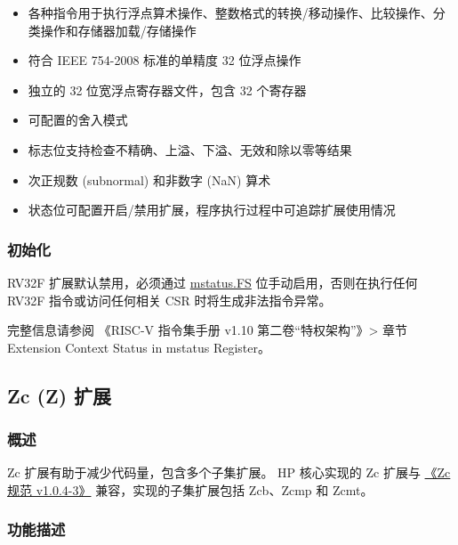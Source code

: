 \documentclass[main\_\_CN.tex]{subfiles}
\begin{document}
\begin{itemize}
    \item 各种指令用于执行浮点算术操作、整数格式的转换/移动操作、比较操作、分类操作和存储器加载/存储操作
    \item 符合 IEEE 754-2008 标准的单精度 32 位浮点操作
    \item 独立的 32 位宽浮点寄存器文件，包含 32 个寄存器
    \item 可配置的舍入模式
    \item 标志位支持检查不精确、上溢、下溢、无效和除以零等结果
    \item 次正规数 (subnormal) 和非数字 (NaN) 算术
    \item 状态位可配置开启/禁用扩展，程序执行过程中可追踪扩展使用情况
\end{itemize}

\subsubsection{初始化}
\label{sec:riscvcpu-fpu-init}

RV32F 扩展默认禁用，必须通过 \hyperref[fielddesc:MSTATUS_FS]{mstatus.FS} 位手动启用，否则在执行任何 RV32F 指令或访问任何相关 CSR 时将生成非法指令异常。

完整信息请参阅 《RISC-V 指令集手册 v1.10 第二卷“特权架构”》> 章节 Extension Context Status in mstatus Register。

\newpage


\newpage
\subsection{Zc (Z) 扩展}
\label{sec:riscvcpu-zc}

\subsubsection{概述}
\label{sec:riscvcpu-zc-overview}

Zc 扩展有助于减少代码量，包含多个子集扩展。\chipname{} HP 核心实现的 Zc 扩展与 \href{https://github.com/riscvarchive/riscv-code-size-reduction/blob/v1.0.4-3/Zc-specification/Zc.adoc}{《Zc 规范 v1.0.4-3》} 兼容，实现的子集扩展包括 Zcb、Zcmp 和 Zcmt。

\subsubsection{功能描述}
\label{sec:riscvcpu-zc-func-descr}
\end{document}

